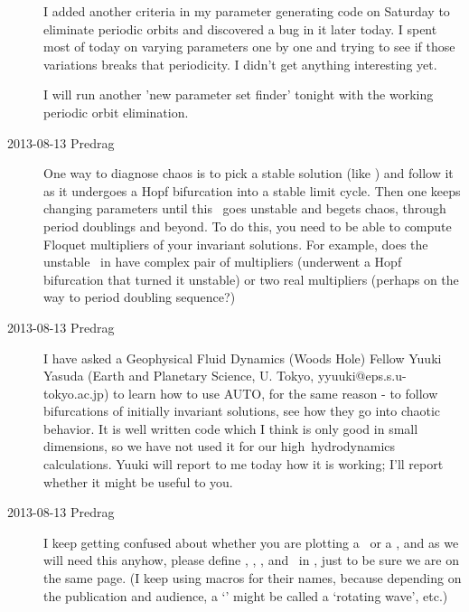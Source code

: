 \begin{description}
I added another criteria in my parameter generating code on Saturday to eliminate periodic orbits and discovered a bug in it later today. I spent most of today on varying parameters one by one and trying to see if those variations breaks that periodicity. I didn't get anything interesting yet.

I will run another 'new parameter set finder' tonight with the working periodic orbit elimination.

\item[2013-08-13 Predrag] One way to diagnose chaos  is to pick a stable
solution (like ) and follow it as it undergoes a
Hopf bifurcation into a stable limit cycle. Then one keeps changing
parameters until this \po\ goes unstable and begets chaos, through period
doublings and beyond. To do this, you need to be able to compute Floquet
multipliers of your invariant solutions. For example, does the unstable
\rpo\ in  have complex pair of multipliers
(underwent a Hopf bifurcation that turned it unstable) or two real
multipliers (perhaps on the way to period doubling sequence?)

\item[2013-08-13 Predrag] I have asked a Geophysical Fluid Dynamics
(Woods Hole) Fellow Yuuki Yasuda (Earth and Planetary Science, U. Tokyo,
yyuuki@eps.s.u-tokyo.ac.jp) to learn how to use
 {AUTO}, for the same
reason - to follow bifurcations of initially invariant solutions, see how
they go into chaotic behavior. It is well written code which I think is
only good in small dimensions, so we have not used it for our high\dmn\
hydrodynamics calculations. Yuuki will report to me today how it is
working; I'll report whether it might be useful to you.

\item[2013-08-13 Predrag]
I keep getting confused about whether you are plotting a \reqv\ or a \po,
and as we will need this anyhow, please define \eqv, \reqv, \po, and
\rpo\ in \refsect{chap:2modesBBproj}, just to be sure we are on the same
page. (I keep using macros for their names, because depending on the
publication and audience, a `\reqv' might be called a `rotating wave',
etc.)

\end{description}

